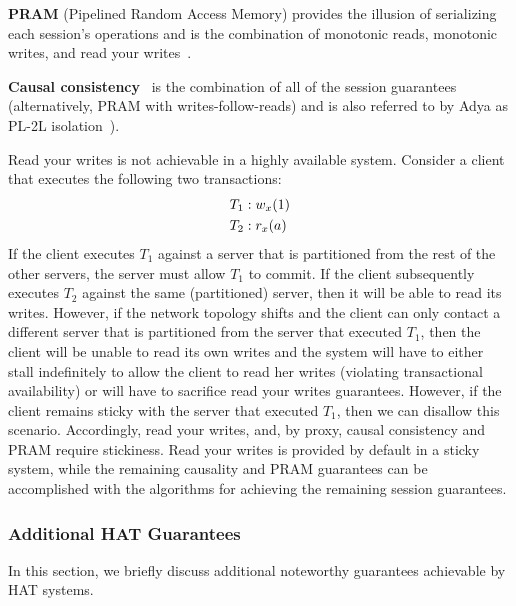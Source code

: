 \vspace{.5em}\noindent\textbf{{PRAM}} (Pipelined Random Access
Memory) provides the illusion of serializing each session's operations
and is the combination of monotonic reads, monotonic writes, and read
your writes~\cite{herlihy-art}.

\vspace{.5em}\noindent\textbf{{Causal
    consistency}}~\cite{causalmemory} is the combination of all of the
session guarantees~\cite{sessiontocausal} (alternatively, PRAM with
writes-follow-reads) and is also referred to by Adya as PL-2L
isolation~\cite{adya}).\vspace{.5em}


Read your writes is not achievable in a highly available
system. Consider a client that executes the following two transactions:
\begin{align*}
\small\vspace{-1em}
T_1 &: w_x(1)
\\T_2 &: r_x(a)\vspace{-1em}
\end{align*}
If the client executes $T_1$ against a server that is partitioned from
the rest of the other servers, the server must allow $T_1$ to
commit. If the client subsequently executes $T_2$ against the same (partitioned)
server, then it will be able to read its writes. However, if the
network topology shifts and the client can only contact a different
server that is partitioned from the server that executed $T_1$, then
the client will be unable to read its own writes and the system will
have to either stall indefinitely to allow the client to read her
writes (violating transactional availability) or will have to
sacrifice read your writes guarantees. However, if the client remains
sticky with the server that executed $T_1$, then we can disallow this
scenario. Accordingly, read your writes, and, by proxy, causal
consistency and PRAM require stickiness. Read your writes is provided
by default in a sticky system, while the remaining causality and PRAM
guarantees can be accomplished with the algorithms for achieving the
remaining session guarantees.

\subsubsection{Additional HAT Guarantees}

In this section, we briefly discuss additional noteworthy guarantees
achievable by HAT systems.

